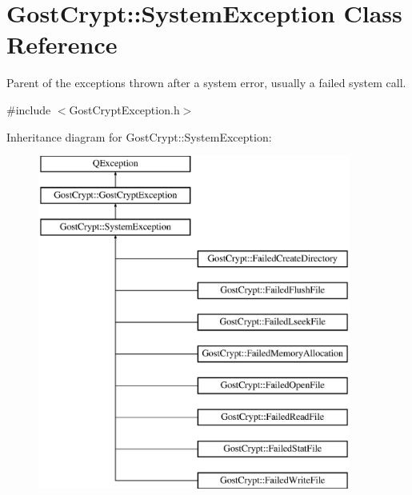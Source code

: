 \hypertarget{class_gost_crypt_1_1_system_exception}{}\section{Gost\+Crypt\+:\+:System\+Exception Class Reference}
\label{class_gost_crypt_1_1_system_exception}


Parent of the exceptions thrown after a system error, usually a failed system call.  




{\ttfamily \#include $<$Gost\+Crypt\+Exception.\+h$>$}

Inheritance diagram for Gost\+Crypt\+:\+:System\+Exception\+:\begin{figure}[H]
\begin{center}
\leavevmode
\includegraphics[height=11.000000cm]{class_gost_crypt_1_1_system_exception}
\end{center}
\end{figure}
